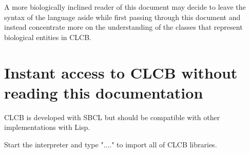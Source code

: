 \documentclass{book}
\begin{document}
A more biologically inclined reader of this document may decide
to leave the syntax of the language aside while first passing through
this document and instead concentrate more on the understanding
of the classes that represent biological entities in CLCB.

\section{Instant access to CLCB without reading this documentation}

CLCB is developed with SBCL but should be compatible with other implementations with Lisp.

Start the interpreter and type "...." to import all of CLCB libraries.
\end{document}

